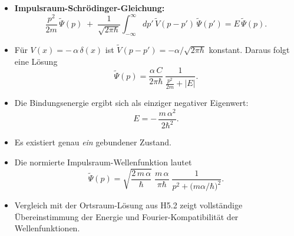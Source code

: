 \documentclass[12pt,a4paper]{scrartcl}
\begin{document}
\begin{itemize}
  \item \textbf{Impulsraum-Schrödinger-Gleichung:}
  \[
    \frac{p^2}{2m}\,\widetilde\Psi(p)
    \;+\; \frac{1}{\sqrt{2\pi\hbar}} \int_{-\infty}^\infty dp'\,\widetilde V(p - p')\,\widetilde\Psi(p') 
    = E\,\widetilde\Psi(p).
  \]
  \item Für $V(x) = -\,\alpha\,\delta(x)$ ist $\widetilde V(p-p') = -\alpha/\sqrt{2\pi\hbar}$ konstant. Daraus folgt eine Lösung
  \[
    \widetilde\Psi(p) = \frac{\alpha\,C}{2\pi\hbar}\,\frac{1}{\frac{p^2}{2m} + |E|}.
  \]
  \item Die Bindungsenergie ergibt sich als einziger negativer Eigenwert:
  \[
    E = -\,\frac{m\,\alpha^2}{2\hbar^2}.
  \]
  \item Es existiert genau \emph{ein} gebundener Zustand.
  \item Die normierte Impulsraum-Wellenfunktion lautet
  \[
    \widetilde\Psi(p) 
    = \sqrt{\frac{2\,m\,\alpha}{\hbar}}\;\frac{m\,\alpha}{\pi\hbar}\;\frac{1}{p^2 + \bigl(m\alpha/\hbar\bigr)^2}.
  \]
  \item Vergleich mit der Ortsraum-Lösung aus H5.2 zeigt vollständige Übereinstimmung der Energie und Fourier-Kompatibilität der Wellenfunktionen.
\end{itemize}
\end{document}
